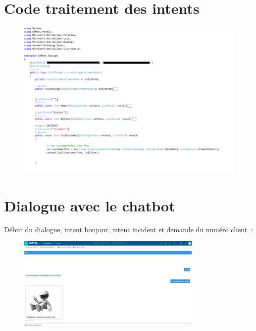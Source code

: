 \graphicspath{{Annexes/}}
\appendix


\chapter{Code traitement des intents}
\label{Code}

\begin{figure}[h]
	\centering
		\includegraphics[width = \textwidth]{code.png}
\end{figure}


\chapter{Dialogue avec le chatbot}
\label{Dialogue chatbot}

Début du dialogue, intent bonjour, intent incident et demande du numéro client :
\vspace{1em}

\begin{figure}[ht]
	\centering
		\includegraphics[width = 0.8\textwidth]{1.png}
\end{figure}

